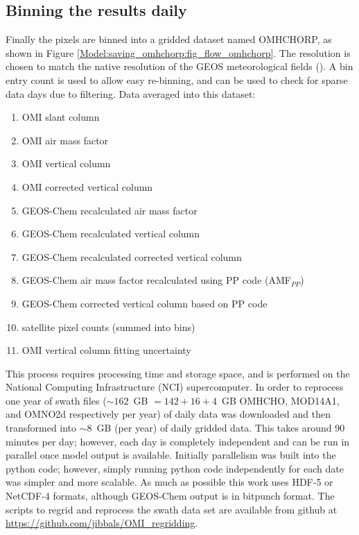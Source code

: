     

  \subsection{Binning the results daily}
    \label{Model:omiRecalc:binning}
    Finally the pixels are binned into a gridded dataset named OMHCHORP, as shown in Figure \ref{Model:saving_omhchorp:fig_flow_omhchorp}.
    The resolution is chosen to match the native resolution of the GEOS meteorological fields (\highhr).
    A bin entry count is used to allow easy re-binning, and can be used to check for sparse data days due to filtering.
    Data averaged into this dataset:
    \begin{enumerate}
      \item OMI slant column %
      \item OMI air mass factor %
      \item OMI vertical column %
      \item OMI corrected vertical column %
      \item GEOS-Chem recalculated air mass factor %
      \item GEOS-Chem recalculated vertical column %
      \item GEOS-Chem recalculated corrected vertical column %
      \item GEOS-Chem air mass factor recalculated using PP code (AMF$_{PP}$)
      \item GEOS-Chem corrected vertical column based on PP code
      \item satellite pixel counts (summed into bins)
      \item OMI vertical column fitting uncertainty
    \end{enumerate}
    
    This process requires processing time and storage space, and is performed on the National Computing Infrastructure (NCI) supercomputer.
    In order to reprocess one year of swath files ($\sim 162$~GB $ = 142 + 16 + 4$~GB OMHCHO, MOD14A1, and OMNO2d respectively per year) of daily data was downloaded and then transformed into $\sim 8$~GB (per year) of daily gridded data.
    This takes around 90 minutes per day; however, each day is completely independent and can be run in parallel once model output is available.
    Initially parallelism was built into the python code; however, simply running python code independently for each date was simpler and more scalable.
    As much as possible this work uses HDF-5 or NetCDF-4 formats, although GEOS-Chem output is in bitpunch format.
    The scripts to regrid and reprocess the swath data set are available from github at \url{https://github.com/jibbals/OMI_regridding}.
  
